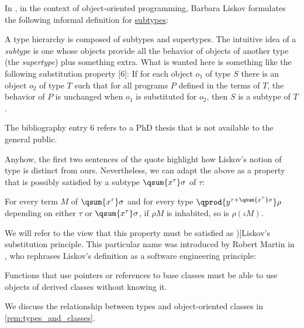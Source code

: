 \begin{concept}\label{con:liskov_substitution_principle}
  In \cite[25]{Liskov1987DataAbstractionAndHierarchy}, in the context of object-oriented programming, Barbara Liskov formulates the following informal definition for \hyperref[def:dependent_subtype]{subtypes}:
  \begin{displayquote}
    A type hierarchy is composed of subtypes and supertypes. The intuitive idea of a \textit{subtype} is one whose objects provide all the behavior of objects of another type (the \textit{supertype}) plus something extra. What is wanted here is something like the following substitution property [6]: If for each object \( o_1 \) of type \( S \) there is an object \( o_2 \) of type \( T \) such that for all programs \( P \) defined in the terms of \( T \), the behavior of \( P \) is unchanged when \( o_1 \) is substituted for \( o_2 \), then \( S \) is a subtype of \( T \).
  \end{displayquote}

  The bibliography entry \( 6 \) refers to a PhD thesis that is not available to the general public.

  Anyhow, the first two sentences of the quote highlight how Liskov's notion of type is distinct from ours. Nevertheless, we can adapt the above as a property that is possibly satisfied by a subtype \( \qsum {x^\tau} \sigma \) of \( \tau \):
  \begin{displayquote}
    For every term \( M \) of \( \qsum {x^\tau} \sigma \) and for every type \( \qprod {y^{\tau + \qsum {x^\tau} \sigma}} \rho \) depending on either \( \tau \) or \( \qsum {x^\tau} \sigma \), if \( \rho M \) is inhabited, so is \( \rho (\iota M) \).
  \end{displayquote}

  We will refer to the view that this property must be satisfied as \term[en=(the) Liskov substitution principle (\cite*[1]{Martin1996LiskovSubstitutionPrinciple})]{Liskov's substitution principle}. This particular name was introduced by Robert Martin in \cite[1]{Martin1996LiskovSubstitutionPrinciple}, who rephrases Liskov's definition as a software engineering principle:
  \begin{displayquote}
    Functions that use pointers or references to base classes must be able to use objects of derived classes without knowing it.
  \end{displayquote}

  We discuss the relationship between types and object-oriented classes in \cref{rem:types_and_classes}.
\end{concept}

